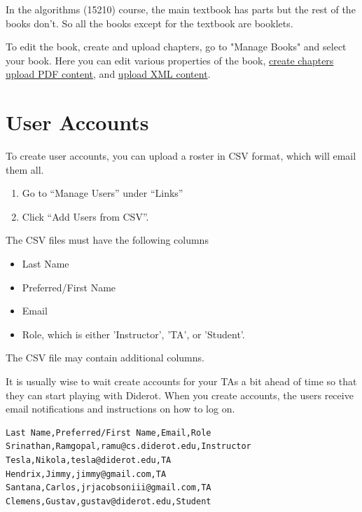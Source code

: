 \begin{example}
In the algorithms (15210) course, the main textbook has parts but
the rest of the books don't.  So all the books except for the textbook are booklets.
\end{example}


\begin{gram}
To edit the book, create and upload chapters, go to "Manage Books" and select your book.  Here you can edit various properties of the book, 
%
\href{guide:chapter::create}{create chapters}
%
\href{guide:chapter::upload-pdf}{upload PDF content}, and
\href{guide:chapter::upload-xml}{upload XML content}.
\end{gram}


\section{User Accounts} 

\begin{gram}[Creation]
To create user accounts, you can upload a roster in CSV format, which will email them all.
%
\begin{enumerate}
\item
Go to ``Manage Users'' under ``Links'' 
\item
Click ``Add Users from CSV''.
\end{enumerate}

The CSV files must have the following columns
\begin{itemize}
\item Last Name
\item Preferred/First Name
\item Email
\item Role, which is either 'Instructor', 'TA', or 'Student'. 
\end{itemize} 
%
The CSV file may contain additional columns.

%
It is usually wise to wait create accounts for your TAs a bit ahead of time so that they can start playing with Diderot. 
%
When you create accounts, the users receive email notifications and instructions on how to log on.
\end{gram}

\begin{example}
\begin{lstlisting}
Last Name,Preferred/First Name,Email,Role
Srinathan,Ramgopal,ramu@cs.diderot.edu,Instructor
Tesla,Nikola,tesla@diderot.edu,TA
Hendrix,Jimmy,jimmy@gmail.com,TA
Santana,Carlos,jrjacobsoniii@gmail.com,TA
Clemens,Gustav,gustav@diderot.edu,Student
\end{lstlisting}

\end{example}
